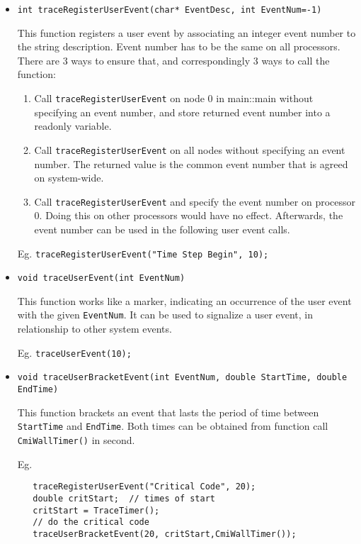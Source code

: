 \documentclass[10pt,dvips]{article}
\begin{document}
\begin{itemize}
\item
{\tt int traceRegisterUserEvent(char* EventDesc, int EventNum=-1) }

This function registers a user event by associating an integer event number to
the string description. Event number has to be the same on all processors. There
are 3 ways to ensure that, and correspondingly 3 ways to call the function:

\begin{enumerate}
\item
Call {\tt traceRegisterUserEvent} on node 0 in main::main without specifying
an event number, and store returned event number into a readonly variable.
\item
Call {\tt traceRegisterUserEvent} on all nodes without specifying an event
number. The returned value is the common event number that is agreed on system-wide.
\item
Call {\tt traceRegisterUserEvent} and specify the event number on processor 0.
Doing this on other processors would have no effect. Afterwards, the event number
can be used in the following user event calls.
\end{enumerate}

Eg. {\tt traceRegisterUserEvent("Time Step Begin", 10);}

\item
{\tt void traceUserEvent(int EventNum) }

This function works like a marker, indicating an occurrence of the user event
with the given {\tt EventNum}. It can be used to signalize a user event, in
relationship to other system events.

Eg. {\tt traceUserEvent(10);}

\item
{\tt void traceUserBracketEvent(int EventNum, double StartTime, double EndTime) }

This function brackets an event that lasts the period of time between
{\tt StartTime} and {\tt EndTime}. Both times can be obtained from function call
{\tt CmiWallTimer()} in second.

Eg.
\begin{verbatim}
   traceRegisterUserEvent("Critical Code", 20);
   double critStart;  // times of start
   critStart = TraceTimer();
   // do the critical code
   traceUserBracketEvent(20, critStart,CmiWallTimer());
\end{verbatim}

\end{itemize}
\end{document}
